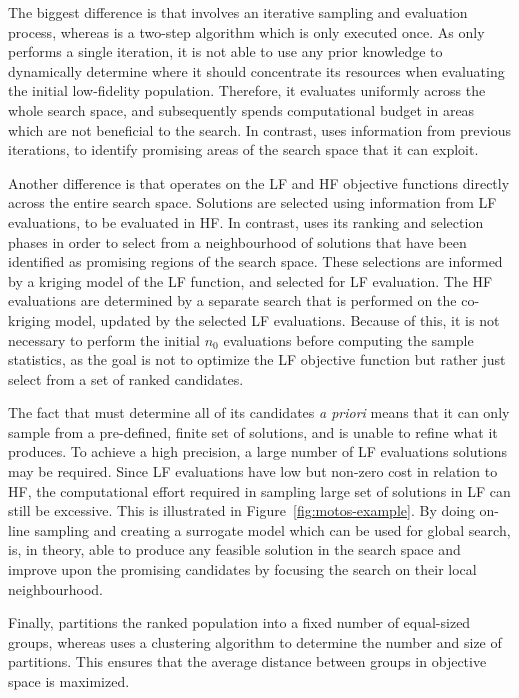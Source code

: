 The biggest difference is that \AlgName{} involves an iterative sampling and evaluation process, whereas \motos{} is a two-step algorithm which is only executed once. As \motos{} only performs a single iteration, it is not able to use any prior knowledge to dynamically determine where it should concentrate its resources when evaluating the initial low-fidelity population. Therefore, it evaluates uniformly across the whole search space, and subsequently spends computational budget in areas which are not beneficial to the search. In contrast, \AlgName{} uses information from previous iterations, to identify promising areas of the search space that it can exploit.

Another difference is that \motos{} operates on the LF and HF objective functions directly across the entire search space. Solutions are selected using information from LF evaluations, to be evaluated in HF. In contrast, \AlgName{} uses its ranking and selection phases in order to select from a neighbourhood of solutions that have been identified as promising regions of the search space. These selections are informed by a kriging model of the LF function, and selected for LF evaluation. The HF evaluations are determined by a separate search that is performed on the co-kriging model, updated by the selected LF evaluations. Because of this, it is not necessary to perform the initial $n_0$ evaluations before computing the sample statistics, as the goal is not to optimize the LF objective function but rather just select from a set of ranked candidates.

The fact that \motos{} must determine all of its candidates \emph{a priori} means that it can only sample from a pre-defined, finite set of solutions, and is unable to refine what it produces. To achieve a high precision, a large number of LF evaluations solutions may be required. Since LF evaluations have low but non-zero cost in relation to HF, the computational effort required in sampling large set of solutions in LF can still be excessive. This is illustrated in Figure~\ref{fig:motos-example}. By doing on-line sampling and creating a surrogate model which can be used for global search, \AlgName{} is, in theory, able to produce any feasible solution in the search space and improve upon the promising candidates by focusing the search on their local neighbourhood.

Finally, \motos{} partitions the ranked population into a fixed number of equal-sized groups, whereas \AlgName{} uses a clustering algorithm to determine the number and size of partitions. This ensures that the average distance between groups in objective space is maximized. 

